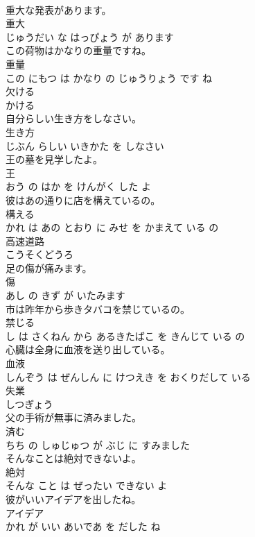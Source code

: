 \documentclass[8pt]{extreport}
\begin{document}
\begin{CJK}{UTF8}{min}
\\	重大な発表があります。	
\\	重大 
\\	じゅうだい な はっぴょう が あります			
\\	この荷物はかなりの重量ですね。	
\\	重量 
\\	この にもつ は かなり の じゅうりょう です ね			
\\	欠ける	
\\	かける		
\\	自分らしい生き方をしなさい。	
\\	生き方 
\\	じぶん らしい いきかた を しなさい			
\\	王の墓を見学したよ。	
\\	王 
\\	おう の はか を けんがく した よ			
\\	彼はあの通りに店を構えているの。	
\\	構える 
\\	かれ は あの とおり に みせ を かまえて いる の			
\\	高速道路	
\\	こうそくどうろ		
\\	足の傷が痛みます。	
\\	傷 
\\	あし の きず が いたみます			
\\	市は昨年から歩きタバコを禁じているの。	
\\	禁じる 
\\	し は さくねん から あるきたばこ を きんじて いる の			
\\	心臓は全身に血液を送り出している。	
\\	血液 
\\	しんぞう は ぜんしん に けつえき を おくりだして いる			
\\	失業	
\\	しつぎょう		
\\	父の手術が無事に済みました。	
\\	済む 
\\	ちち の しゅじゅつ が ぶじ に すみました			
\\	そんなことは絶対できないよ。	
\\	絶対 
\\	そんな こと は ぜったい できない よ			
\\	彼がいいアイデアを出したね。	
\\	アイデア 
\\	かれ が いい あいであ を だした ね			

\end{CJK}
\end{document}
